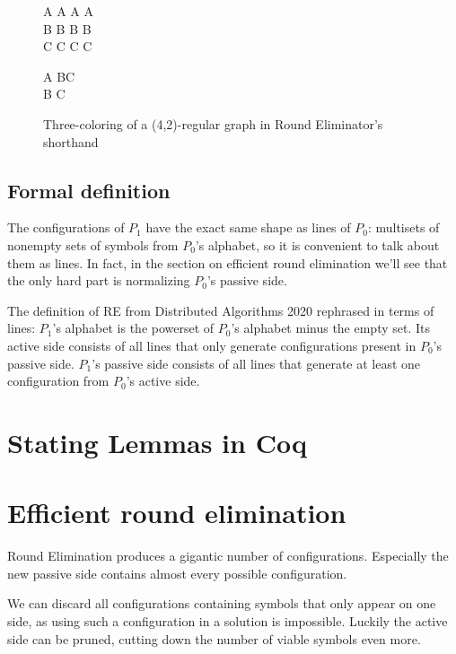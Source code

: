 \documentclass[english, 12pt, a4paper, sci, utf8, a-1b, online]{aaltothesis}
\begin{document}
\begin{figure}[h]
  \centering
  \begin{tcolorbox}[width=.2\textwidth, nobeforeafter, title=active side]
  A A A A \\
  B B B B \\
  C C C C
  \end{tcolorbox}
  \begin{tcolorbox}[width=.2\textwidth, nobeforeafter, title=passive side]
  A BC \\
  B C
  \end{tcolorbox}
  \caption{Three-coloring of a (4,2)-regular graph in Round Eliminator's shorthand}
\end{figure}

\subsection{Formal definition}
The configurations of $P_1$ have the exact same shape as lines of $P_0$: multisets of nonempty sets of symbols from $P_0$'s alphabet, so it is convenient to talk about them as lines. In fact, in the section on efficient round elimination we'll see that the only hard part is normalizing $P_0$'s passive side.

The definition of RE from Distributed Algorithms 2020\cite{DA2020} rephrased in terms of lines: $P_1$'s alphabet is the powerset of $P_0$'s alphabet minus the empty set. Its active side consists of all lines that only generate configurations present in $P_0$'s passive side. $P_1$'s passive side consists of all lines that generate at least one configuration from $P_0$'s active side.

\section{Stating Lemmas in Coq}

\section{Efficient round elimination}

Round Elimination produces a gigantic number of configurations. Especially the new passive side contains almost every possible configuration.

We can discard all configurations containing symbols that only appear on one side, as using such a configuration in a solution is impossible. Luckily the active side can be pruned, cutting down the number of viable symbols even more. 
\end{document}
